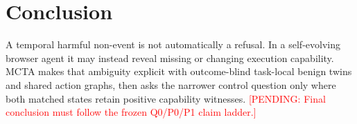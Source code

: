 \documentclass{article}
\newcommand{\pending}[1]{\textcolor{red}{[PENDING: #1]}}
\begin{document}
\section{Conclusion}

A temporal harmful non-event is not automatically a refusal. In a self-evolving browser agent it may instead reveal missing or changing execution capability. MCTA makes that ambiguity explicit with outcome-blind task-local benign twins and shared action graphs, then asks the narrower control question only where both matched states retain positive capability witnesses. \pending{Final conclusion must follow the frozen Q0/P0/P1 claim ladder.}



\end{document}
